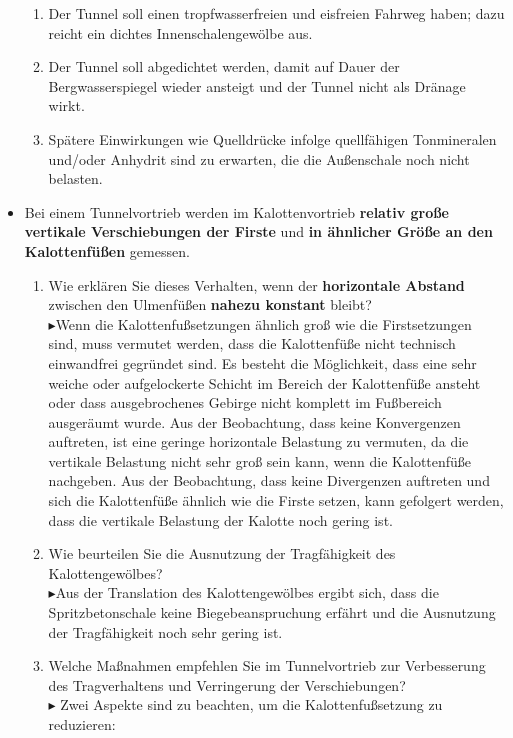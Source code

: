 \documentclass[fleqn,twoside]{article}
\begin{document}
\begin{small}
\begin{itemize}
\begin{enumerate}
        \item Der Tunnel soll einen tropfwasserfreien und eisfreien Fahrweg haben; dazu reicht ein dichtes Innenschalengewölbe aus.
        \item Der Tunnel soll abgedichtet werden, damit auf Dauer der Bergwasserspiegel wieder ansteigt und der Tunnel nicht als Dränage wirkt.
        \item Spätere Einwirkungen wie Quelldrücke infolge quellfähigen Tonmineralen und/oder Anhydrit sind zu erwarten, die die Außenschale noch nicht belasten.
    \end{enumerate}
    \item Bei einem Tunnelvortrieb werden im Kalottenvortrieb \textbf{relativ große vertikale Verschiebungen der Firste} und \textbf{in ähnlicher Größe an den Kalottenfüßen} gemessen.
    \begin{enumerate}
        \item Wie erklären Sie dieses Verhalten, wenn der \textbf{horizontale Abstand} zwischen den Ulmenfüßen \textbf{nahezu konstant} bleibt?\\
        $\blacktriangleright$Wenn die Kalottenfußsetzungen ähnlich groß wie die Firstsetzungen sind, muss vermutet werden, dass die Kalottenfüße nicht technisch einwandfrei gegründet sind. Es besteht die Möglichkeit, dass eine sehr weiche oder aufgelockerte Schicht im Bereich der Kalottenfüße ansteht oder dass ausgebrochenes Gebirge nicht komplett im Fußbereich ausgeräumt wurde. Aus der Beobachtung, dass keine Konvergenzen auftreten, ist eine geringe horizontale Belastung zu vermuten, da die vertikale Belastung nicht sehr groß sein kann, wenn die Kalottenfüße nachgeben. Aus der Beobachtung, dass keine Divergenzen auftreten und sich die Kalottenfüße ähnlich wie die Firste setzen, kann gefolgert werden, dass die vertikale Belastung der Kalotte noch gering ist.
        \item Wie beurteilen Sie die Ausnutzung der Tragfähigkeit des Kalottengewölbes?\\
        $\blacktriangleright$Aus der Translation des Kalottengewölbes ergibt sich, dass die Spritzbetonschale keine Biegebeanspruchung erfährt und die Ausnutzung der Tragfähigkeit noch sehr gering ist.
        \item  Welche Maßnahmen empfehlen Sie im Tunnelvortrieb zur Verbesserung des Tragverhaltens und Verringerung der Verschiebungen?\\
        $\blacktriangleright$ Zwei Aspekte sind zu beachten, um die Kalottenfußsetzung zu reduzieren:
        \begin{enumerate}

\end{enumerate}
\end{enumerate}
\end{itemize}
\end{small}
\end{document}
